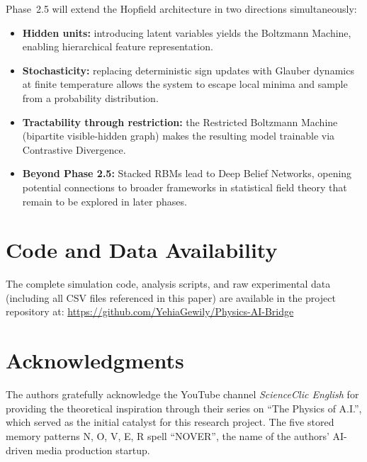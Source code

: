 \documentclass[11pt,a4paper,twocolumn]{article}
\begin{document}
Phase~2.5 will extend the Hopfield architecture in two directions
simultaneously:
\begin{itemize}
    \item \textbf{Hidden units:} introducing latent variables yields the
    Boltzmann Machine, enabling hierarchical feature representation.
    \item \textbf{Stochasticity:} replacing deterministic sign updates with
    Glauber dynamics at finite temperature allows the system to escape local
    minima and sample from a probability distribution.
    \item \textbf{Tractability through restriction:} the Restricted Boltzmann
    Machine (bipartite visible-hidden graph) makes the resulting model
    trainable via Contrastive Divergence.
    \item \textbf{Beyond Phase 2.5:} Stacked RBMs lead to Deep Belief
    Networks, opening potential connections to broader frameworks in
    statistical field theory that remain to be explored in later phases.
\end{itemize}

\section*{Code and Data Availability}

The complete simulation code, analysis scripts, and raw experimental data
(including all CSV files referenced in this paper) are available in the
project repository at:
\url{https://github.com/YehiaGewily/Physics-AI-Bridge}

\section*{Acknowledgments}

The authors gratefully acknowledge the YouTube channel \emph{ScienceClic
English} for providing the theoretical inspiration through their series on
``The Physics of A.I.'', which served as the initial catalyst for this
research project. The five stored memory patterns N, O, V, E, R spell
``NOVER'', the name of the authors' AI-driven media production startup.



\end{document}
